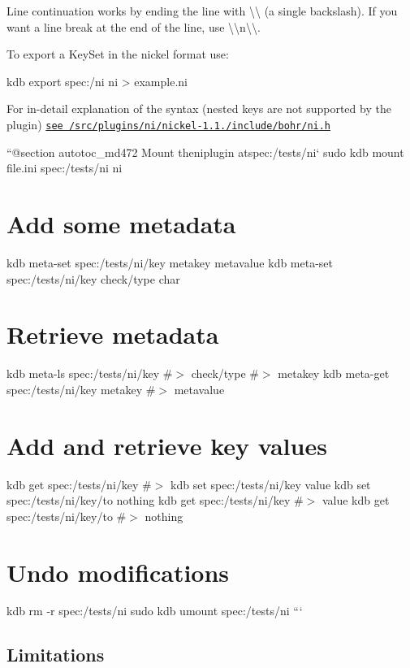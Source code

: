 Line continuation works by ending the line with {\ttfamily \textbackslash{}\textbackslash{}} (a single backslash). If you want a line break at the end of the line, use {\ttfamily \textbackslash{}\textbackslash{}n\textbackslash{}\textbackslash{}}.

To export a {\ttfamily Key\+Set} in the nickel format use\+:


\begin{DoxyCode}
kdb export spec:/ni ni > example.ni
\end{DoxyCode}


For in-\/detail explanation of the syntax (nested keys are not supported by the plugin) \href{/home/jenkins/workspace/libelektra-release/src/plugins/ni/nickel-1.1.0/include/bohr/ni.h}{\tt see /src/plugins/ni/nickel-\/1.1./include/bohr/ni.h}

``{\ttfamily  @section autotoc\+\_\+md472 Mount the}ni{\ttfamily plugin at}spec\+:/tests/ni` sudo kdb mount file.\+ini spec\+:/tests/ni ni\hypertarget{autotoc_md469_autotoc_md473}{}\section{Add some metadata}\label{autotoc_md469_autotoc_md473}
kdb meta-\/set spec\+:/tests/ni/key metakey metavalue kdb meta-\/set spec\+:/tests/ni/key check/type char\hypertarget{autotoc_md469_autotoc_md474}{}\section{Retrieve metadata}\label{autotoc_md469_autotoc_md474}
kdb meta-\/ls spec\+:/tests/ni/key \#$>$ check/type \#$>$ metakey kdb meta-\/get spec\+:/tests/ni/key metakey \#$>$ metavalue\hypertarget{autotoc_md469_autotoc_md475}{}\section{Add and retrieve key values}\label{autotoc_md469_autotoc_md475}
kdb get spec\+:/tests/ni/key \#$>$ kdb set spec\+:/tests/ni/key value kdb set spec\+:/tests/ni/key/to nothing kdb get spec\+:/tests/ni/key \#$>$ value kdb get spec\+:/tests/ni/key/to \#$>$ nothing\hypertarget{autotoc_md469_autotoc_md476}{}\section{Undo modifications}\label{autotoc_md469_autotoc_md476}
kdb rm -\/r spec\+:/tests/ni sudo kdb umount spec\+:/tests/ni ```\hypertarget{autotoc_md469_autotoc_md477}{}\subsection{Limitations}\label{autotoc_md469_autotoc_md477}

